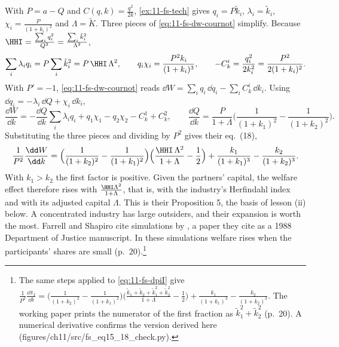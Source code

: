 With $P = a - Q$ and $C(q, k) = \frac{q^2}{2k}$, \cref{ex:11-fs-tech} gives $q_i = P\tilde k_i$, $\lambda_i = \tilde
k_i$, $\chi_i = \frac{P}{(1 + k_i)^2}$ and $\Lambda = \tilde K$. Three pieces of \eqref{eq:11-fs-dw-cournot}
simplify. Because $\HHI = \frac{\sum_iq_i^2}{Q^2} = \frac{\sum_i\tilde k_i^2}{\Lambda^2}$,
\begin{equation*}
\sum_i\lambda_iq_i = P\sum_i\tilde k_i^2 = P\,\HHI\,\Lambda^2,
\qquad
q_i\chi_i = \frac{P^2k_i}{(1 + k_i)^3},
\qquad
-C^i_k = \frac{q_i^2}{2k_i^2} = \frac{P^2}{2(1 + k_i)^2} .
\end{equation*}
With $P' = -1$, \eqref{eq:11-fs-dw-cournot} reads $\dd W = \sum_iq_i\,\dd q_i - \sum_iC^i_k\,\dd k_i$. Using
$\dd q_i = -\lambda_i\,\dd Q + \chi_i\,\dd k_i$,
\begin{equation*}
\frac{\dd W}{\dd k} = -\frac{\dd Q}{\dd k}\sum_i\lambda_iq_i + q_1\chi_1 - q_2\chi_2 - C^1_k + C^2_k,
\qquad
\frac{\dd Q}{\dd k} = \frac{P}{1 + \Lambda}\Big(\frac{1}{(1 + k_1)^2} - \frac{1}{(1 + k_2)^2}\Big).
\end{equation*}
Substituting the three pieces and dividing by $P^2$ gives their eq.~(18),
\begin{equation}\label{eq:11-fs-eq18}
\frac{1}{P^2}\frac{\dd W}{\dd k} = \Big(\frac{1}{(1 + k_2)^2} - \frac{1}{(1 + k_1)^2}\Big)
\Big(\frac{\HHI\,\Lambda^2}{1 + \Lambda} - \frac{1}{2}\Big) + \frac{k_1}{(1 + k_1)^3} - \frac{k_2}{(1 + k_2)^3} .
\end{equation}
With $k_1 > k_2$ the first factor is positive. Given the partners' capital, the welfare effect therefore rises with
$\frac{\HHI\Lambda^2}{1 + \Lambda}$, that is, with the industry's Herfindahl index and with its adjusted capital
$\Lambda$. This is their Proposition 5, the basis of lesson (ii) below. A concentrated industry has large outsiders,
and their expansion is worth the most. Farrell and Shapiro cite simulations by \citet{McAfeeWilliams1992}, a paper
they cite as a 1988 Department of Justice manuscript. In these simulations welfare rises when the participants'
shares are small (p.~20).\footnote{The same steps applied to
\eqref{eq:11-fs-dpiI} give $\frac{1}{P^2}\frac{\dd\pi_I}{\dd k} = \big(\frac{1}{(1 + k_2)^2} - \frac{1}{(1 +
k_1)^2}\big)\big(\frac{\tilde k_1 + \tilde k_2 + \tilde k_1^2 + \tilde k_2^2}{1 + \Lambda} - \frac{1}{2}\big) +
\frac{k_1}{(1 + k_1)^3} - \frac{k_2}{(1 + k_2)^3}$. The working paper prints the numerator of the first fraction as
$\tilde k_1^2 + \tilde k_2^2$ (p.~20). A numerical derivative confirms the version derived here
(figures/ch11/src/fs\_eq15\_18\_check.py).}

